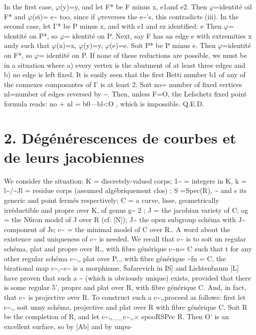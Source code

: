 \documentclass[11pt]{article}
\theoremstyle{plain}
\theoremstyle{definition}
\theoremstyle{remark}
\begin{document}
In the first case, $\varphi$(y)=y, and let F* be F minus x, e1and e2. Then $\varphi$=identit\'e oil F* and $\varphi$(ei)= e\textasciitilde{} too, since if $\varphi$reverses the e\textasciitilde{}'s, this contradicts (iii). In the second case, let I'* be P minus x, and with e1 and ez identified: e Then $\varphi$= identit\'e on P*, so $\varphi$= identit\'e on P. Next, say F has an edge e with extremities x andy such that $\varphi$(x)=x, $\varphi$(y)=y, $\varphi$(e)=e. Soit P* be P minus e. Then $\varphi$=identit\'e on F*, so $\varphi$= identit\'e on P. If none of these reductions are possible, we must be in a situation where a) every vertex is the abutment of at least three edges and b) no edge is left fixed. It is easily seen that the first Betti number b1 of any of the connexes composantes of I' is at least 2. Soit no= number of fixed vertices nl=number of edges reversed by \textasciitilde{}. Then, unless F=O, the Lefschetz fixed point formula reads: no + nl = b0---bl<O , which is impossible. Q.E.D.

\section*{2. D\'eg\'en\'erescences de courbes et de leurs jacobiennes}
We consider the situation: K = discretely-valued corps; 1\textasciitilde{} = integers in K, k = l\textasciitilde{}/\textasciitilde{}Jl = residue corps (assumed alg\'ebriquement clos) ; S =Spec(R), \textasciitilde{} and s its generic and point ferm\'es respectively; C = a curve, lisse, geometrically irr\'eductible and propre over K, of genus g\textasciitilde{} 2 ; J = the jacobian variety of C; og = the N6ron model of J over R (cf. [N]); J\textasciitilde{} the open subgroup sch\'ema with J\textasciitilde{} component of Js; c\textasciitilde{} = the minimal model of C over R.. A word about the existence and uniqueness of c\textasciitilde{} is needed. We recall that c\textasciitilde{} is to soit un regular sch\'ema, plat and propre over R., with fibre g\'en\'erique c\textasciitilde{}n= C such that t for any other regular sch\'ema c\textasciitilde{},, plat over P,., with fibre g\'en\'erique \textasciitilde{}fn = C, the birational map c\textasciitilde{},\textasciitilde{}c\textasciitilde{} is a morphisme, \v{S}afarevich in IS] and Lichtenbaum [L] have proven that such a \textasciitilde{} (which is obviously unique) exists, provided that there is some regular 5', propre and plat over R, with fibre g\'en\'erique C. And, in fact, that c\textasciitilde{} is projective over R. To construct such a c\textasciitilde{},,proceed as follows: first let c\textasciitilde{},, soit unny sch\'ema, projective and plat over R with fibre g\'en\'erique C. Soit R be the completion of R, and let c\textasciitilde{},,\_\_c\textasciitilde{},,$\times$ spooRSPec R. Then O' is an excellent surface, so by [Ab] and by unpu-
\end{document}
